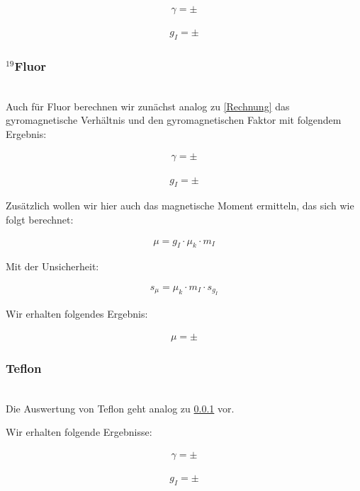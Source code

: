 \documentclass[12pt]{article}
\begin{document}
\begin{align*}
\gamma =  \pm
\end{align*}

\begin{align*}
g_I =   \pm
\end{align*}

\subsubsection{$^{19}$Fluor} \label{MEINEXISTEINARSCH}
\ \\

Auch für Fluor berechnen wir zunächst analog zu \ref{Rechnung} das gyromagnetische Verhältnis und den gyromagnetischen Faktor mit folgendem Ergebnis:

\begin{align*}
\gamma =  \pm
\end{align*}

\begin{align*}
g_I =   \pm
\end{align*}

Zusätzlich wollen wir hier auch das magnetische Moment ermitteln, das sich wie folgt berechnet:

\begin{align*}
\mu = g_I \cdot \mu_k \cdot m_I
\end{align*}

Mit der Unsicherheit:

\begin{align*}
s_\mu = \mu_k \cdot m_I \cdot s_{g_I}
\end{align*}

Wir erhalten folgendes Ergebnis:

\begin{align*}
\mu =  \pm
\end{align*}
\subsubsection{Teflon}
\ \\
Die Auswertung von Teflon geht analog zu \ref{MEINEXISTEINARSCH} vor.

Wir erhalten folgende Ergebnisse:

\begin{align*}
\gamma =  \pm
\end{align*}

\begin{align*}
g_I =   \pm
\end{align*}
\end{document}
